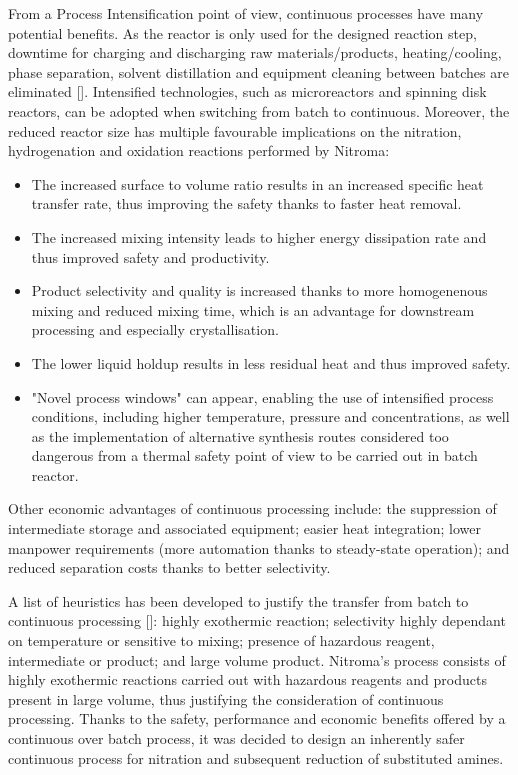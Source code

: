 From a Process Intensification point of view, continuous processes have many potential benefits. As the  reactor is only used for the designed reaction step, downtime for charging and discharging raw materials/products, heating/cooling, phase separation, solvent distillation and equipment cleaning between batches are eliminated []. Intensified technologies, such as microreactors and spinning disk reactors, can be adopted when switching from batch to continuous. Moreover, the reduced reactor size has multiple favourable implications on the nitration, hydrogenation and oxidation reactions performed by Nitroma:
\begin{itemize}
    \item The increased surface to volume ratio results in an increased specific heat transfer rate, thus improving the safety thanks to faster heat removal.
    \item The increased mixing intensity leads to higher energy dissipation rate and thus improved safety and productivity.
    \item Product selectivity and quality is increased thanks to more homogenenous mixing and reduced mixing time, which is an advantage for downstream processing and especially crystallisation.
    \item The lower liquid holdup results in less residual heat and thus improved safety.
    \item "Novel process windows" can appear, enabling the use of intensified process conditions, including higher temperature, pressure and concentrations, as well as the implementation of alternative synthesis routes considered too dangerous from  a thermal safety point of view to be carried out in batch reactor.
\end{itemize}
Other economic advantages of continuous processing include: the suppression of intermediate storage and associated equipment; easier heat integration; lower manpower requirements (more automation thanks to steady-state operation); and reduced separation costs thanks to better selectivity.

A list of heuristics has been developed to justify the transfer from batch to continuous processing []: highly exothermic reaction; selectivity highly dependant on temperature or sensitive to mixing; presence of hazardous reagent, intermediate or product; and large volume product.
Nitroma's process consists of highly exothermic reactions carried out with hazardous reagents and products present in large volume, thus justifying the consideration of continuous processing. Thanks to the safety, performance and economic benefits offered by a continuous over batch process, it was decided to design an inherently safer continuous process for nitration and subsequent reduction of substituted amines.

